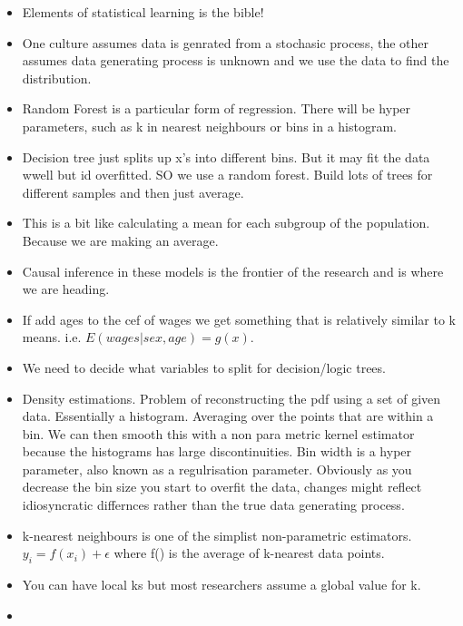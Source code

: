 \documentclass[12pt]{article}
\begin{document}
\begin{itemize}
      \item Elements of statistical learning is the bible!
      \item One culture assumes data is genrated from a stochasic process, the other assumes data generating process is
            unknown and we use the data to find the distribution.

      \item Random Forest is a particular form of regression. There will be hyper parameters, such as k in nearest neighbours
            or bins in a histogram.

      \item Decision tree just splits up x's into different bins. But it may fit the data wwell but id overfitted.
            SO we use a random forest. Build lots of trees for different samples and then just average.
      \item This is a bit like calculating a mean for each subgroup of the population. Because we are making
            an average.

      \item Causal inference in these models is the frontier of the research and is where we are heading.
      \item If add ages to the cef of wages we get something that is relatively similar to k means. i.e. $E(wages |sex, age) = g(x)$.
      \item We need to decide what variables to split for decision/logic trees.
      \item Density estimations. Problem of reconstructing the pdf using a set of given data.
            Essentially a histogram. Averaging over the points that are within a bin.
            We can then smooth this with a non para metric kernel estimator because the histograms has large discontinuities.
            Bin width is a hyper parameter, also known as a regulrisation parameter.
            Obviously as you decrease the bin size you start to overfit the data, changes might reflect idiosyncratic differnces rather than the true
            data generating process.

      \item k-nearest neighbours is one of the simplist non-parametric estimators.
            $y_{i}= f(x_{i}) + \epsilon$ where f() is the average of k-nearest data points.

      \item You can have local ks but most researchers assume a global value for k.
      \item

\end{itemize}
\end{document}
